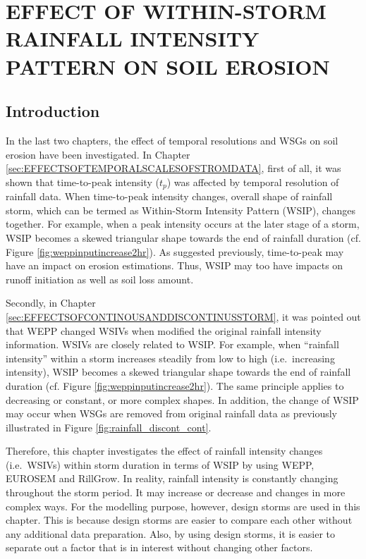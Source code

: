 \chapter{EFFECT OF WITHIN-STORM RAINFALL INTENSITY PATTERN ON SOIL EROSION}
\label{sec:EFFECTSOFRAINFALLINTENSITYCHANGESONSOILEROSION}

\section{Introduction}
\label{sec:IntensiyPatternsIntroduction}

In the last two chapters, the effect of temporal resolutions and WSGs on
soil erosion have been investigated.
In Chapter \ref{sec:EFFECTSOFTEMPORALSCALESOFSTROMDATA}, first of all, it was
shown that time-to-peak intensity ($t_p$) was affected by temporal resolution
of rainfall data. When time-to-peak intensity changes, overall shape of
rainfall storm, which can be termed as Within-Storm Intensity Pattern (WSIP),
changes together. For example, when a peak intensity occurs at the later stage
of a storm, WSIP becomes a skewed triangular shape towards the end of rainfall
duration (cf. Figure \ref{fig:weppinputincrease2hr}). As suggested previously,
time-to-peak may have an impact on erosion estimations. Thus, WSIP may too
have impacts on runoff initiation as well as soil loss amount.

Secondly, in Chapter \ref{sec:EFFECTSOFCONTINOUSANDDISCONTINUSSTORM}, it was
pointed out that WEPP changed WSIVs when modified the original rainfall
intensity information. WSIVs are closely related to WSIP. For example, when
``rainfall intensity'' within a storm increases steadily from low to high (i.e.\
increasing intensity), WSIP becomes a skewed triangular shape towards the end of
rainfall duration (cf. Figure \ref{fig:weppinputincrease2hr}). The same
principle applies to decreasing or constant, or more complex shapes. In
addition, the change of WSIP may occur when WSGs are removed from
original rainfall data as previously illustrated in Figure
\ref{fig:rainfall_discont_cont}.

Therefore, this chapter investigates the effect of rainfall intensity changes
(i.e.\ WSIVs) within storm duration in terms of WSIP by using WEPP, EUROSEM and
RillGrow.
In reality, rainfall intensity is constantly changing throughout the storm
period. It may increase or decrease and changes in more complex ways. For the
modelling purpose, however, design storms are used in this chapter. This is
because design storms are easier to compare each other without any additional
data preparation. Also, by using design storms, it is easier to separate out
a factor that is in interest without changing other factors.


